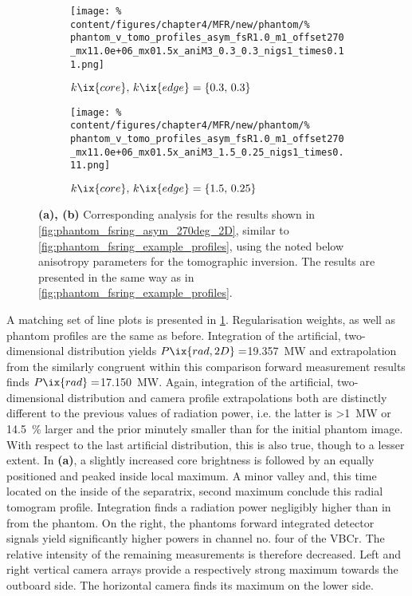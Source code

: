                 \begin{figure}[t]%
                    \centering%
                    \begin{subfigure}{\textwidth}%
                        \centering%
                        \texttt{[image: \%
                            content/figures/chapter4/MFR/new/phantom/\%
                            phantom\_v\_tomo\_profiles\_asym\_fsR1.0\_m1\_offset270\_mx11.0e+06\_mx01.5x\_aniM3\_0.3\_0.3\_nigs1\_times0.11.png]}%
                        \caption{$k\ix{core},\,k\ix{edge}=\left\{0.3,\,0.3\right\}$}%
                    \end{subfigure}%
                    \newline%
                    \begin{subfigure}{\textwidth}%
                        \centering%
                        \texttt{[image: \%
                            content/figures/chapter4/MFR/new/phantom/\%
                            phantom\_v\_tomo\_profiles\_asym\_fsR1.0\_m1\_offset270\_mx11.0e+06\_mx01.5x\_aniM3\_1.5\_0.25\_nigs1\_times0.11.png]}%
                        \caption{$k\ix{core},\,k\ix{edge}=\left\{1.5,\,0.25\right\}$}%
                    \end{subfigure}%
                    \caption{\textbf{(a), (b)} Corresponding analysis for the results shown in \cref{fig:phantom_fsring_asym_270deg_2D}, similar to \cref{fig:phantom_fsring_example_profiles}, using the noted below anisotropy parameters for the tomographic inversion. The results are presented in the same way as in \cref{fig:phantom_fsring_example_profiles}.}\label{fig:phantom_fsring_asym_270deg_profiles}%
                \end{figure}%
%
                A matching set of line plots is presented in \cref{fig:phantom_fsring_asym_270deg_profiles}. Regularisation weights, as well as phantom profiles are the same as before. Integration of the artificial, two-dimensional distribution yields $P\ix{rad,2D}=$\SI{19.357}{\mega\watt} and extrapolation from the similarly congruent within this comparison forward measurement results finds $P\ix{rad}=$\SI{17.150}{\mega\watt}. Again, integration of the artificial, two-dimensional distribution and camera profile extrapolations both are distinctly different to the previous values of radiation power, i.e. the latter is >\SI{1}{\mega\watt} or \SI{14.5}{\percent} larger and the prior minutely smaller than for the initial phantom image. With respect to the last artificial distribution, this is also true, though to a lesser extent. In \textbf{(a)}, a slightly increased core brightness is followed by an equally positioned and peaked inside local maximum. A minor valley and, this time located on the inside of the separatrix, second maximum conclude this radial tomogram profile. Integration finds a radiation power negligibly higher than in from the phantom. On the right, the phantoms forward integrated detector signals yield significantly higher powers in channel no. four of the VBCr. The relative intensity of the remaining measurements is therefore decreased. Left and right vertical camera arrays provide a respectively strong maximum towards the outboard side. The horizontal camera finds its maximum on the lower side.\\%
